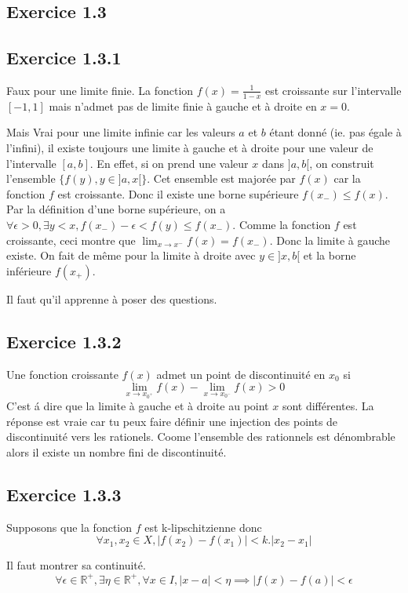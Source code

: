 \documentclass[]{book}
\theoremstyle{definition}
\newcommand{\bb}[1]{\mathbb{#1}}
\newcommand{\R}{\bb{R}}
\begin{document}
\subsection*{Exercice 1.3}
\subsection*{Exercice 1.3.1}
Faux pour une limite finie. La fonction $f(x) = \frac{1}{1-x}$ est croissante sur l'intervalle $[-1,1]$ mais n'admet pas de limite finie \`a gauche et \`a droite en $x=0$.

Mais Vrai pour une limite infinie car les valeurs $a$ et $b$ \'etant donn\'e (ie. pas \'egale \`a l'infini), il existe toujours une limite \`a gauche et \`a droite pour une valeur de l'intervalle $[a,b]$. En effet, si on prend une valeur $x$ dans $]a,b[$, on construit l'ensemble $\{f(y), y \in ]a,x[\}$. Cet ensemble est major\'ee par $f(x)$ car la fonction $f$ est croissante. Donc il existe une borne sup\'erieure $f(x_{-}) \leq f(x)$. Par la d\'efinition d'une borne sup\'erieure, on a $\forall \epsilon>0, \exists y < x, f(x_{-})-\epsilon < f(y) \leq f(x_{-})$. Comme la fonction $f$ est croissante, ceci montre que $\lim_{x \to x^{-}} f(x) = f(x_{-})$. Donc la limite \`a gauche existe. On fait de m\^eme pour la limite \`a droite avec $y \in ]x,b[$ et la borne inf\'erieure $f(x_{+})$.

Il faut qu'il apprenne \`a poser des questions.

\subsection*{Exercice 1.3.2}
Une fonction croissante $f(x)$ admet un point de discontinuit\'e en $x_0$ si 
$$\lim_{x \to x_{0^{+}}}f(x) - \lim_{x \to x_{0^{-}}}f(x) > 0$$
C'est \'a dire que la limite \`a gauche et \`a droite au point $x$ sont diff\'erentes.
La r\'eponse est vraie car tu peux faire d\'efinir une injection des points de discontinuit\'e vers les rationels. Coome l'ensemble des rationnels est d\'enombrable alors il existe un nombre fini de discontinuit\'e.

\subsection*{Exercice 1.3.3}
Supposons que la fonction $f$ est k-lipschitzienne donc 
$$
\forall x_1, x_2 \in X, |f(x_2)-f(x_1)| < k.|x_2-x_1|
$$

Il faut montrer sa continuit\'e.
$$
\forall \epsilon \in \R^{+}, \exists \eta  \in \R^{+}, \forall x \in I, |x-a| < \eta \implies  |f(x)-f(a)| < \epsilon
$$
\end{document}

